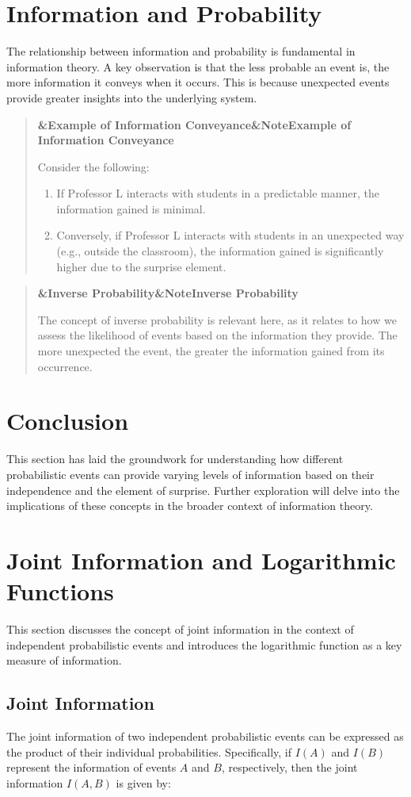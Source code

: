 \documentclass[a4paper]{article}
\newcommand{\boxheading}[1]{%
  \par\smallskip
  \noindent\textbf{\ifx&#1&Note\else#1\fi}\par
  \smallskip
}
\newenvironment{exbox}[1][]{%
  \begin{quote}\color{brown!70!black}\boxheading{#1}\normalcolor
}{\end{quote}}
\newenvironment{rembox}[1][]{%
  \begin{quote}\color{black!70}\boxheading{#1}\normalcolor
}{\end{quote}}
\begin{document}
\section{Information and Probability}
The relationship between information and probability is fundamental in information theory. A key observation is that the less probable an event is, the more information it conveys when it occurs. This is because unexpected events provide greater insights into the underlying system.

\begin{exbox}[Example of Information Conveyance]
Consider the following:
\begin{enumerate}
    \item If Professor L interacts with students in a predictable manner, the information gained is minimal.
    \item Conversely, if Professor L interacts with students in an unexpected way (e.g., outside the classroom), the information gained is significantly higher due to the surprise element.
\end{enumerate}
\end{exbox}

\begin{rembox}[Inverse Probability]
The concept of inverse probability is relevant here, as it relates to how we assess the likelihood of events based on the information they provide. The more unexpected the event, the greater the information gained from its occurrence.
\end{rembox}

\section{Conclusion}
This section has laid the groundwork for understanding how different probabilistic events can provide varying levels of information based on their independence and the element of surprise. Further exploration will delve into the implications of these concepts in the broader context of information theory.

\section{Joint Information and Logarithmic Functions}
This section discusses the concept of joint information in the context of independent probabilistic events and introduces the logarithmic function as a key measure of information.

\subsection{Joint Information}
The joint information of two independent probabilistic events can be expressed as the product of their individual probabilities. Specifically, if \( I(A) \) and \( I(B) \) represent the information of events \( A \) and \( B \), respectively, then the joint information \( I(A, B) \) is given by:
\end{document}
